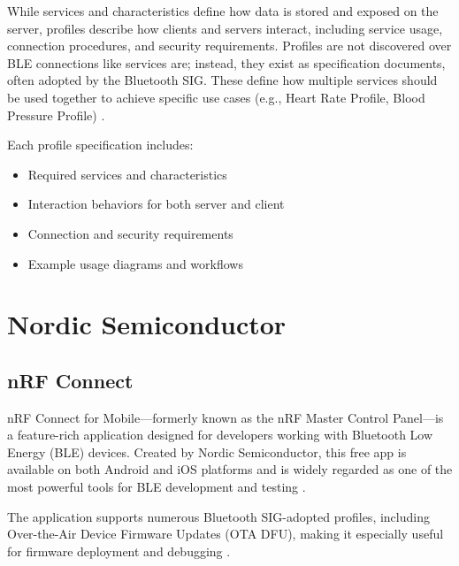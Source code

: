 While services and characteristics define how data is stored and exposed on the server, profiles describe how clients and servers interact, including service usage, connection procedures, and security requirements. Profiles are not discovered over BLE connections like services are; instead, they exist as specification documents, often adopted by the Bluetooth SIG. These define how multiple services should be used together to achieve specific use cases (e.g., Heart Rate Profile, Blood Pressure Profile) \cite{introtoble}.

Each profile specification includes:
\begin{itemize}
    \item Required services and characteristics
    \item Interaction behaviors for both server and client
    \item Connection and security requirements
    \item Example usage diagrams and workflows \cite{introtoble}
\end{itemize}

\section{Nordic Semiconductor}

\subsection{nRF Connect}

nRF Connect for Mobile—formerly known as the nRF Master Control Panel—is a feature-rich application designed for developers working with Bluetooth Low Energy (BLE) devices. Created by Nordic Semiconductor, this free app is available on both Android and iOS platforms and is widely regarded as one of the most powerful tools for BLE development and testing \cite{buildingBLEsystems}.

The application supports numerous Bluetooth SIG-adopted profiles, including Over-the-Air Device Firmware Updates (OTA DFU), making it especially useful for firmware deployment and debugging \cite{buildingBLEsystems}.

